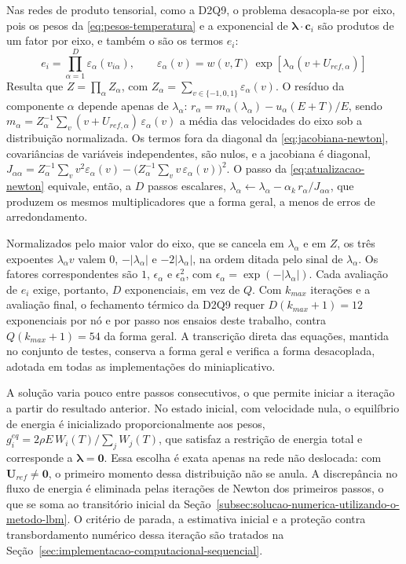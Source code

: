 Nas redes de produto tensorial, como a D2Q9, o problema desacopla-se por eixo, pois os pesos da \eqref{eq:pesos-temperatura} e a exponencial de $\boldsymbol{\lambda} \cdot \mathbf{c}_i$ são produtos de um fator por eixo, e também o são os termos $e_i$:
\begin{equation}\label{eq:ei-produto}
    e_i = \prod_{\alpha=1}^{D} \varepsilon_\alpha(v_{i\alpha}), \qquad \varepsilon_\alpha(v) = w(v, T)\, \exp\!\left[ \lambda_\alpha \left( v + U_{ref,\alpha} \right) \right]
\end{equation}
Resulta que $Z = \prod_\alpha Z_\alpha$, com $Z_\alpha = \sum_{v \in \{-1,0,1\}} \varepsilon_\alpha(v)$.
O resíduo da componente $\alpha$ depende apenas de $\lambda_\alpha$: $r_\alpha = m_\alpha(\lambda_\alpha) - u_\alpha (E + T)/E$, sendo $m_\alpha = Z_\alpha^{-1} \sum_v (v + U_{ref,\alpha})\, \varepsilon_\alpha(v)$ a média das velocidades do eixo sob a distribuição normalizada.
Os termos fora da diagonal da \eqref{eq:jacobiana-newton}, covariâncias de variáveis independentes, são nulos, e a jacobiana é diagonal, $J_{\alpha\alpha} = Z_\alpha^{-1} \sum_v v^2 \varepsilon_\alpha(v) - \big( Z_\alpha^{-1} \sum_v v\, \varepsilon_\alpha(v) \big)^2$.
O passo da \eqref{eq:atualizacao-newton} equivale, então, a $D$ passos escalares, $\lambda_\alpha \gets \lambda_\alpha - \alpha_k\, r_\alpha / J_{\alpha\alpha}$, que produzem os mesmos multiplicadores que a forma geral, a menos de erros de arredondamento.

Normalizados pelo maior valor do eixo, que se cancela em $\lambda_\alpha$ e em $Z$, os três expoentes $\lambda_\alpha v$ valem $0$, $-|\lambda_\alpha|$ e $-2|\lambda_\alpha|$, na ordem ditada pelo sinal de $\lambda_\alpha$.
Os fatores correspondentes são $1$, $\epsilon_\alpha$ e $\epsilon_\alpha^2$, com $\epsilon_\alpha = \exp(-|\lambda_\alpha|)$.
Cada avaliação de $e_i$ exige, portanto, $D$ exponenciais, em vez de $Q$.
Com $k_{max}$ iterações e a avaliação final, o fechamento térmico da D2Q9 requer $D(k_{max}+1) = 12$ exponenciais por nó e por passo nos ensaios deste trabalho, contra $Q(k_{max}+1) = 54$ da forma geral.
A transcrição direta das equações, mantida no conjunto de testes, conserva a forma geral e verifica a forma desacoplada, adotada em todas as implementações do miniaplicativo.

A solução varia pouco entre passos consecutivos, o que permite iniciar a iteração a partir do resultado anterior.
No estado inicial, com velocidade nula, o equilíbrio de energia é inicializado proporcionalmente aos pesos, $g_i^{eq} = 2\rho E\, W_i(T) / \sum_j W_j(T)$, que satisfaz a restrição de energia total e corresponde a $\boldsymbol{\lambda} = \mathbf{0}$.
Essa escolha é exata apenas na rede não deslocada: com $\mathbf{U}_{ref} \neq \mathbf{0}$, o primeiro momento dessa distribuição não se anula.
A discrepância no fluxo de energia é eliminada pelas iterações de Newton dos primeiros passos, o que se soma ao transitório inicial da Seção~\ref{subsec:solucao-numerica-utilizando-o-metodo-lbm}.
O critério de parada, a estimativa inicial e a proteção contra transbordamento numérico dessa iteração são tratados na Seção~\ref{sec:implementacao-computacional-sequencial}.

